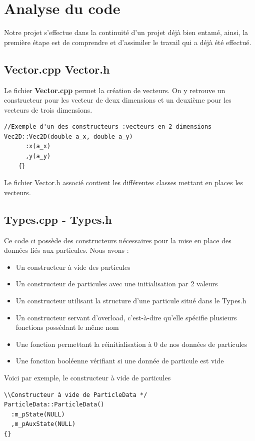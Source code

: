 \chapter{Analyse du code}

Notre projet s'effectue dans la continuité d'un projet déjà bien entamé, ainsi, la première étape est de comprendre et d'assimiler le travail qui a déjà été effectué.

\section{Vector.cpp Vector.h}
Le fichier \textbf{Vector.cpp} permet la création de vecteurs. On y retrouve un constructeur pour les vecteur de deux dimensions et un deuxième pour les vecteurs de trois dimensions.

\begin{lstlisting}
//Exemple d'un des constructeurs :vecteurs en 2 dimensions
Vec2D::Vec2D(double a_x, double a_y)
      :x(a_x)
      ,y(a_y)
    {}
\end{lstlisting}

Le fichier Vector.h associé contient les différentes classes mettant en places les vecteurs.

\section{Types.cpp - Types.h}
Ce code ci possède des constructeurs nécessaires pour la mise en place des données liés aux particules. Nous avons :
\begin{itemize}
    \item Un constructeur à vide des particules
    \item Un constructeur de particules avec une initialisation par 2 valeurs
    \item Un constructeur utilisant la structure d'une particule situé dans le Types.h
    \item Un constructeur servant d'overload, c'est-à-dire qu'elle spécifie plusieurs fonctions possédant le même nom
    \item Une fonction permettant la réinitialisation à 0 de nos données de particules
    \item Une fonction booléenne vérifiant si une donnée de particule est vide
\end{itemize}

Voici par exemple, le constructeur à vide de particules
\begin{lstlisting}
\\Constructeur à vide de ParticleData */
ParticleData::ParticleData()
  :m_pState(NULL)
  ,m_pAuxState(NULL)
{}
\end{lstlisting}

